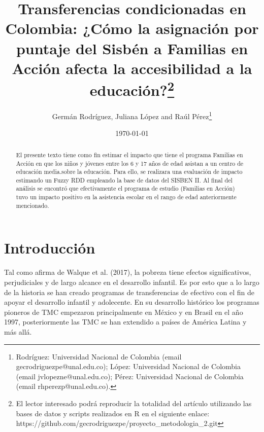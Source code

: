 \documentclass[AER]{AEA}
\begin{document}
\title{Transferencias condicionadas en Colombia: ¿Cómo la asignación por puntaje del Sisbén a Familias en Acción afecta la accesibilidad a la educación?\footnote{El lector interesado podrá reproducir la totalidad del artículo utilizando las bases de datos y scripts realizados en R en el siguiente enlace: https://github.com/gecrodriguezpe/proyecto\_metodologia\_2.git}}
\author{Germán Rodríguez, Juliana López and Raúl Pérez\thanks{Rodríguez: Universidad Nacional de Colombia (email gecrodriguezpe@unal.edu.co); López: Universidad Nacional de Colombia (email jvlopezne@unal.edu.co); Pérez: Universidad Nacional de Colombia (email rhperezp@unal.edu.co).}}
\date{\today}

\begin{abstract}
El presente texto tiene como fin estimar el impacto que tiene el programa Familias en Acción en que los niños y jóvenes entre los 6 y 17 años de edad asistan a un centro de educación media.sobre la educación. Para ello, se realizara una  evaluación de impacto estimando un Fuzzy RDD empleando la base de datos del SISBEN II. Al final del análisis se encontró que efectivamente el programa de estudio (Familias en Acción) tuvo un impacto positivo en la asistencia escolar en el rango de edad anteriormente mencionado.
\end{abstract}


\maketitle

\section{Introducción}
    
Tal como afirma de Walque et al. (2017), la pobreza tiene efectos significativos, perjudiciales y de largo alcance  en  el  desarrollo  infantil.   Es  por  esto que  a  lo  largo  de  la  historia  se  han  creado  programas  de transferencias de efectivo con el fin de apoyar el desarrollo infantil y adolecente. En su desarrollo histórico los programas pioneros de TMC empezaron principalmente en México y en Brasil en el año 1997, posteriormente las TMC se han extendido a países de América Latina y más allá.
    
\end{document}

